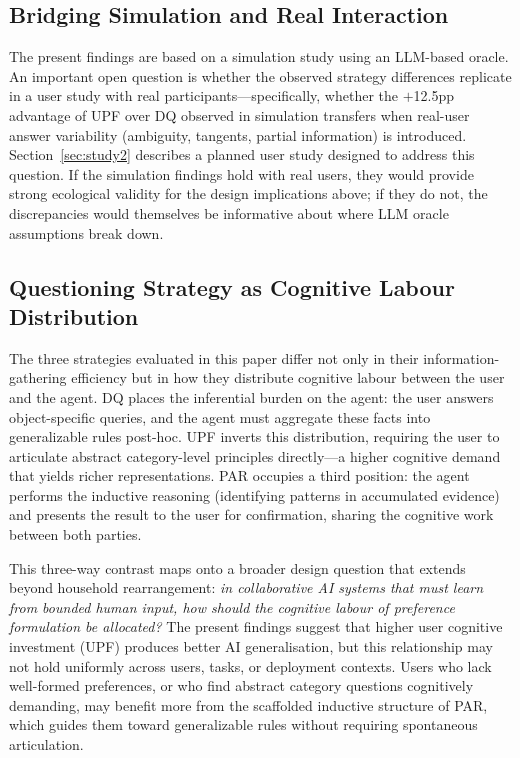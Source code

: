 \documentclass[manuscript,review,anonymous]{acmart}
\begin{document}
{\subsection{Bridging Simulation and Real Interaction}

The present findings are based on a simulation study using an LLM-based oracle. An important open question is whether the observed strategy differences replicate in a user study with real participants---specifically, whether the $+$12.5pp advantage of UPF over DQ observed in simulation transfers when real-user answer variability (ambiguity, tangents, partial information) is introduced. Section~\ref{sec:study2} describes a planned user study designed to address this question. If the simulation findings hold with real users, they would provide strong ecological validity for the design implications above; if they do not, the discrepancies would themselves be informative about where LLM oracle assumptions break down.

\subsection{Questioning Strategy as Cognitive Labour Distribution}

The three strategies evaluated in this paper differ not only in their information-gathering efficiency but in how they distribute cognitive labour between the user and the agent. DQ places the inferential burden on the agent: the user answers object-specific queries, and the agent must aggregate these facts into generalizable rules post-hoc. UPF inverts this distribution, requiring the user to articulate abstract category-level principles directly---a higher cognitive demand that yields richer representations. PAR occupies a third position: the agent performs the inductive reasoning (identifying patterns in accumulated evidence) and presents the result to the user for confirmation, sharing the cognitive work between both parties.

This three-way contrast maps onto a broader design question that extends beyond household rearrangement: \textit{in collaborative AI systems that must learn from bounded human input, how should the cognitive labour of preference formulation be allocated?} The present findings suggest that higher user cognitive investment (UPF) produces better AI generalisation, but this relationship may not hold uniformly across users, tasks, or deployment contexts. Users who lack well-formed preferences, or who find abstract category questions cognitively demanding, may benefit more from the scaffolded inductive structure of PAR, which guides them toward generalizable rules without requiring spontaneous articulation.

}
\end{document}
